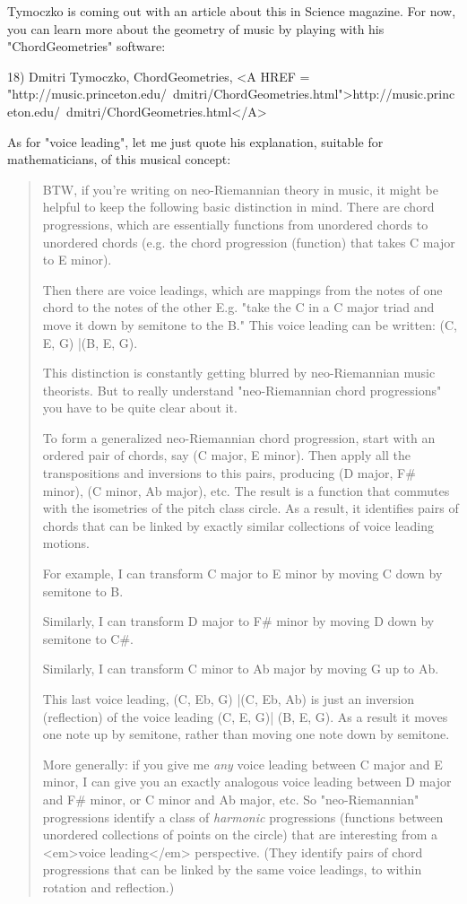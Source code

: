 Tymoczko is coming out with an article about this in Science 
magazine.  For now, you can learn more about the geometry of 
music by playing with his "ChordGeometries" software:

18) Dmitri Tymoczko, ChordGeometries,   
<A HREF = "http://music.princeton.edu/~dmitri/ChordGeometries.html">http://music.princeton.edu/~dmitri/ChordGeometries.html</A>

As for "voice leading", let me just quote his explanation, 
suitable for mathematicians, of this musical concept:

\begin{quote}
  BTW, if you're writing on neo-Riemannian theory in music, it 
  might be helpful to keep the following basic distinction in 
  mind.  There are chord progressions, which are essentially 
  functions from unordered chords to unordered chords (e.g. the 
  chord progression (function) that takes C major to E minor).

  Then there are voice leadings, which are mappings from the notes 
  of one chord to the notes of the other E.g. "take the C in a C 
  major triad and move it down by semitone to the B."  This voice 
  leading can be written: 
(C, E, G) |\to  (B, E, G).

  This distinction is constantly getting blurred by neo-Riemannian 
  music theorists.  But to really understand "neo-Riemannian 
  chord progressions" you have to be quite clear about it.

  To form a generalized neo-Riemannian chord progression, start 
  with an ordered pair of chords, say (C major, E minor).  Then 
  apply all the transpositions and inversions to this pairs, 
  producing (D major, F# minor), (C minor, Ab major), etc.  The 
  result is a function that commutes with the isometries of the 
  pitch class circle.  As a result, it identifies pairs of chords 
  that can be linked by exactly similar collections of voice 
  leading motions.

  For example, I can transform C major to E minor by moving C down 
  by semitone to B.

  Similarly, I can transform D major to F# minor by moving D down 
  by semitone to C#.

  Similarly, I can transform C minor to Ab major by moving G up to 
  Ab.

  This last voice leading, 
(C, Eb, G) |\to  (C, Eb, Ab) 
is just an inversion (reflection) of the voice leading 
(C, E, G)| \to  (B, E, G).  
  As a result it moves one note up by semitone, rather than moving
  one note down by semitone.

  More generally: if you give me \emph{any} voice leading between C 
  major and E minor, I can give you an exactly analogous voice 
  leading between D major and F# minor, or C minor and Ab major, 
  etc.  So "neo-Riemannian" progressions identify a class of 
  \emph{harmonic} progressions (functions between unordered collections
  of points on the circle) that are interesting from a <em>voice 
  leading</em> perspective.  (They identify pairs of chord progressions 
  that can be linked by the same voice leadings, to within rotation 
  and reflection.)
\end{quote}

